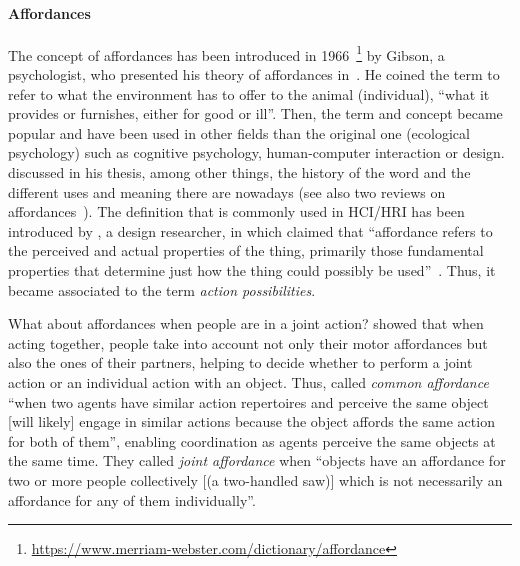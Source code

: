 \documentclass[a4paper,11pt,twoside]{StyleThese}
\begin{document}
\paragraph{Affordances}
The concept of affordances has been introduced in 1966~\footnote{\url{https://www.merriam-webster.com/dictionary/affordance}} by Gibson, a psychologist, who presented his theory of affordances in~\citep{gibson_1979_theory}. He coined the term to refer to what the environment has to offer to the animal (individual), ``what it provides or furnishes, either for good or ill''. Then, the term and concept became popular and have been used in other fields than the original one (ecological psychology) such as cognitive psychology, human-computer interaction or design. \cite{osborne_2014_ecological} discussed in his thesis, among other things, the history of the word and the different uses and meaning there are nowadays (see also two reviews on affordances~\citep{jamone_2016_affordances, bach_2014_affordance}). The definition that is commonly used in HCI/HRI has been introduced by \citeauthor{norman_1988_psychology}, a design researcher, in \citeyear{norman_1988_psychology} which claimed that ``affordance refers to the perceived and actual properties of the thing, primarily those fundamental properties that determine just how the thing could possibly be used''~\citep[p.~9]{norman_1988_psychology}. Thus, it became associated to the term \emph{action possibilities}. 

What about affordances when people are in a joint action? \cite{richardson_2007_judging} showed that when acting together, people take into account not only their motor affordances but also the ones of their partners, helping to decide whether to perform a joint action or an individual action with an object. Thus, \citet[p.~63]{knoblich_2011_joint} called \emph{common affordance} ``when two agents have similar action repertoires and perceive the same object [will likely] engage in similar actions because the object affords the same action for both of them'', enabling coordination as agents perceive the same objects at the same time. They called \emph{joint affordance} when ``objects have an affordance for two or more people collectively [(a two-handled saw)] which is not necessarily an affordance for any of them individually''.
\end{document}
